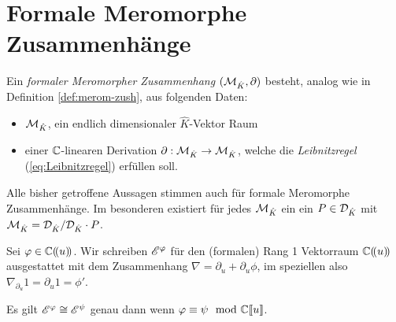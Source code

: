 \section{Formale Meromorphe Zusammenhänge}
%
\begin{comment}
bei ZulaBarbara ist $\hat \cD_{\hat K}=\Cful<\partial_u>$ hier $=\cD_{\hat K}$
\end{comment}
\begin{defn}
Ein \emph{formaler Meromorpher Zusammenhang}
$(\mathcal{M}_{\hat K},\partial)$ besteht, analog wie in Definition
\ref{def:merom-zush}, aus folgenden Daten:
\begin{itemize}
\item $\mathcal{M}_{\hat K}$, ein endlich dimensionaler $\hat K$-Vektor Raum
\item einer $\mathbb{C}$-linearen Derivation $\partial:\mathcal{M}_{\hat K}\rightarrow
\mathcal{M}_{\hat K}$, welche die \emph{Leibnitzregel} (\ref{eq:Leibnitzregel})
erfüllen soll.
\end{itemize}
\end{defn}
\begin{bem}
Alle bisher getroffene Aussagen stimmen auch für formale Meromorphe
Zusammenhänge. Im besonderen existiert für jedes $\mathcal{M}_{\hat K}$ ein ein $P\in
\mathcal{D}_{\hat K}$ mit $\mathcal{M}_{\hat K}=\mathcal{D}_{\hat K}/\mathcal{D}_{\hat K}\cdot P$.
\end{bem}

\begin{defn}
\cite[1.a]{sabbah_Fourier-local}
Sei $\varphi\in\mathbb{C}(\!(u)\!)$.
Wir schreiben $\mathscr{E}^\varphi$ für den (formalen) Rang 1 Vektorraum $\mathbb{C}(\!(u)\!)$
ausgestattet mit dem Zusammenhang $\nabla=\partial_u+\partial_u\phi$, im
speziellen also $\nabla_{\partial_u}1=\partial_u1=\phi'$.\\
\begin{comment}
Also
\begin{align*}
\sE^\phi=\Cful & \overset{\partial_u}{\rightarrow} \Cful\\
1              & \mapsto \phi'(u)\\
f(u)           & \mapsto f'(u)+f(u)\phi'(u)\\
\end{align*}
\end{comment}
\end{defn}

\begin{bem}
\cite[1.a]{sabbah_Fourier-local}
Es gilt $\mathscr{E}^\varphi\cong\mathscr{E}^\psi$ genau dann wenn $\varphi\equiv\psi \mod {{\mathbb C\llbracket u\rrbracket}}$.
\end{bem}

